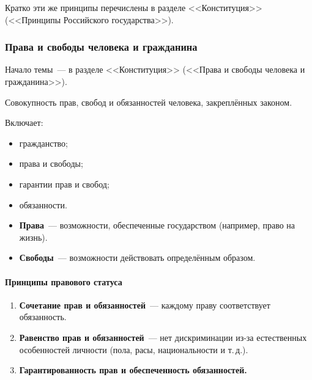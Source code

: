 \documentclass[12pt]{article}
\begin{document}
	\begin{note}
		Кратко эти же принципы перечислены в разделе <<Конституция>> (<<Принципы Российского государства>>).
	\end{note}

	\subsubsection{Права и свободы человека и гражданина}
	
	\begin{note}
		Начало темы~--- в разделе <<Конституция>> (<<Права и свободы человека и гражданина>>).
	\end{note}
	
	\begin{definition}
		Совокупность прав, свобод и обязанностей человека, закреплённых законом.
	\end{definition}
	
	Включает:
	\begin{itemize}
		\item гражданство;
		\item права и свободы;
		\item гарантии прав и свобод;
		\item обязанности.
	\end{itemize}
	
	\begin{itemize}
		\item \textbf{Права}~--- возможности, обеспеченные государством (например, право на жизнь).
		\item \textbf{Свободы}~--- возможности действовать определённым образом.
	\end{itemize}
	
	\paragraph{Принципы правового статуса}
	
	\begin{enumerate}
		\item \textbf{Сочетание прав и обязанностей}~--- каждому праву соответствует обязанность.
		\item \textbf{Равенство прав и обязанностей}~--- нет дискриминации из-за естественных особенностей личности (пола, расы, национальности и т.\,д.).
		\item \textbf{Гарантированность прав и обеспеченность обязанностей.}
	\end{enumerate}
	
\end{document}
